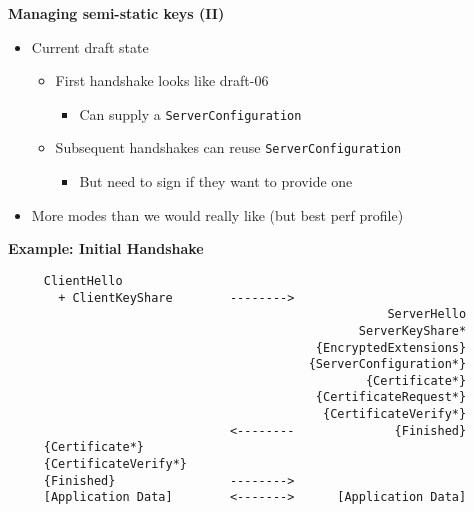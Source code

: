 \documentclass[helvetica]{seminar}
\newcommand{\heading}[1]{%
  \begin{center} 
    \large\bf 
    #1 
  \end{center} 
  \vspace{.4 in}}
\begin{document}
\begin{slide}
\heading{Managing semi-static keys (II)}
\begin{itemize}
\item Current draft state
  \begin{itemize}
  \item First handshake looks like draft-06
    \begin{itemize}
    \item Can supply a \verb^ServerConfiguration^
    \end{itemize}

  \item Subsequent handshakes can reuse \verb^ServerConfiguration^
    \begin{itemize}
      \item But need to sign if they want to provide one
    \end{itemize}
  \end{itemize}
\item More modes than we would really like (but best perf profile)
\end{itemize}
\end{slide}


\begin{slide}
\heading{Example: Initial Handshake}

\vspace{-2ex}
\begin{footnotesize}
\begin{verbatim}
     ClientHello
       + ClientKeyShare        -------->
                                                     ServerHello
                                                 ServerKeyShare*
                                           {EncryptedExtensions}
                                          {ServerConfiguration*}
                                                  {Certificate*}
                                           {CertificateRequest*}
                                            {CertificateVerify*}
                               <--------              {Finished}
     {Certificate*}
     {CertificateVerify*}
     {Finished}                -------->
     [Application Data]        <------->      [Application Data]
\end{verbatim}
\end{footnotesize}

\end{slide}
\end{document}
